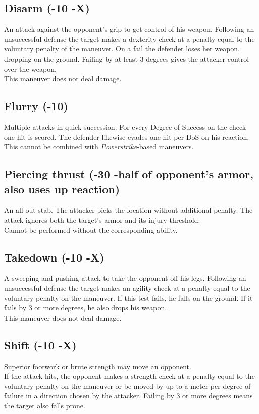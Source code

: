 \subsection*{Disarm (-10 -X)}
An attack against the opponent’s grip to get control of his weapon.
Following an unsuccessful defense the target makes a dexterity check at a penalty equal to the voluntary penalty of the maneuver.
On a fail the defender loses her weapon, dropping on the ground.
Failing by at least 3 degrees gives the attacker control over the weapon.\\
This maneuver does not deal damage.
\subsection*{Flurry (-10)}
Multiple attacks in quick succession.
For every Degree of Success on the check one hit is scored.
The defender likewise evades one hit per DoS on his reaction.
\\%
This cannot be combined with \emph{Powerstrike}-based maneuvers.
\subsection*{Piercing thrust (-30 -half of opponent’s armor, also uses up reaction)}
An all-out stab. The attacker picks the location without additional penalty. The attack ignores both the target's armor and its injury threshold.\\
Cannot be performed without the corresponding ability.
\subsection*{Takedown (-10 -X)}
A sweeping and pushing attack to take the opponent off his legs.
Following an unsuccessful defense the target makes
	an agility check
	at a penalty equal to the voluntary penalty on the maneuver.
If this test fails, he falls on the ground.
If it fails by 3 or more degrees, he also drops his weapon.
\\%
This maneuver does not deal damage.
\subsection*{Shift (-10 -X)}
Superior footwork or brute strength may move an opponent.
\\%
If the attack hits,
	the opponent makes a strength check at a penalty equal to the voluntary penalty on the maneuver
	or be moved by up to a meter per degree of failure in a direction chosen by the attacker.
Failing by 3 or more degrees means the target also falls prone.
